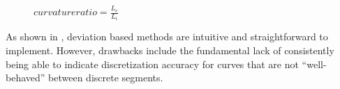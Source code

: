 \begin{figure}[h!]
  \caption{\label{ref:CurvatureRatio} $curvature ratio=  \frac{L_c}{L_i}$ 
\cite{mclaurin10}}
\end{figure}

\noindent As shown in \cite{mclaurin12}, deviation based methods are intuitive and straightforward to implement. However, drawbacks include the fundamental lack of consistently being able to indicate discretization accuracy for curves that are not ``well-behaved'' between discrete segments.
